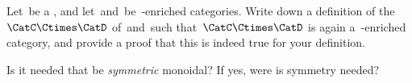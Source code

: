 
\begin{gradedexercise}
    \label{ex:ProductOfEnrichedCats}
    Let~\CatV be a , and let~\CatC and~\CatD be~\CatV-enriched categories.
    Write down a definition of the ~$\CatC \Ctimes \CatD$ of~\CatC and~\CatD such that~$\CatC \Ctimes \CatD$ is again a~\CatV-enriched category, and provide a proof that this is indeed true for your definition.

    Is it needed that \CatV be \emph{symmetric} monoidal?
    If yes, were is symmetry needed?
\end{gradedexercise}

